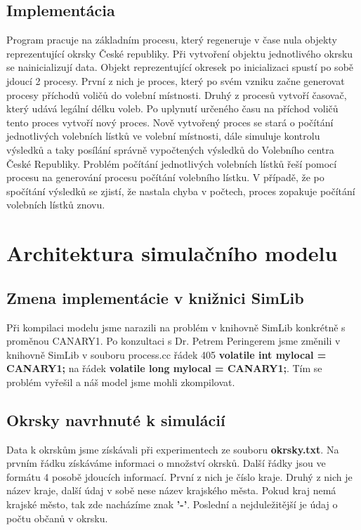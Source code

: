 \documentclass[12pt,a4paper,titlepage,final]{article}
\begin{document}
\subsection{Implementácia}
Program pracuje na základním procesu, který regeneruje v čase nula objekty reprezentující okrsky České republiky. Při vytvoření objektu jednotlivého okrsku se nainicializují data. Objekt reprezentující okresek po inicializaci spustí po sobě jdoucí 2 procesy. První z nich je proces, který po svém vzniku začne generovat procesy příchodů voličů do volební místnosti. Druhý z procesů vytvoří časovač, který udává legální délku voleb. Po uplynutí určeného času na příchod voličů tento proces vytvoří nový proces. Nově vytvořený proces se stará o počítání jednotlivých volebních lístků ve volební místnosti, dále simuluje kontrolu výsledků a taky posílání správně vypočtených výsledků do Volebního centra České Republiky. Problém počítání jednotlivých volebních lístků řeší pomocí procesu na generování procesu počítání volebního lístku. V případě, že po spočítání výsledků se zjistí, že nastala chyba v počtech, proces zopakuje počítání volebních lístků znovu. 


\section{Architektura simulačního modelu}

\subsection{Zmena implementácie v knižnici SimLib}
Při kompilaci modelu jsme narazili na problém v knihovně SimLib konkrétně s proměnou CANARY1. Po konzultaci s Dr. Petrem Peringerem jsme změnili v knihovně SimLib v souboru process.cc řádek 405 \textbf{volatile int mylocal = CANARY1;} na řádek \textbf{volatile long mylocal = CANARY1;}. Tím se problém vyřešil a náš model jsme mohli zkompilovat.

\subsection{Okrsky navrhnuté k simulácií}
Data k okrskům jsme získávali při experimentech ze souboru \textbf{okrsky.txt}. Na prvním řádku získáváme informaci o množství okrsků. Další řádky jsou ve formátu 4 posobě jdoucích informací. První z nich je číslo kraje. Druhý z nich je název kraje, další údaj v sobě nese název krajského města. Pokud kraj nemá krajské město, tak zde nacházíme znak \textbf{'-'}. Poslední a nejduležitější je údaj o počtu občanů v okrsku.
\end{document}
